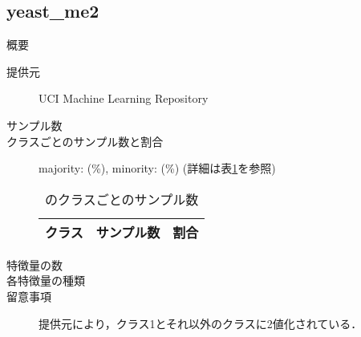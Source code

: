 \subsection{yeast\_me2}
\begin{description}
    \item[概要] \cite{}
    \item[提供元] UCI Machine Learning Repository
    \item[サンプル数] 
    \item[クラスごとのサンプル数と割合] majority:  (\%), minority:  (\%) (詳細は表\ref{tab:}を参照)

        \begin{table}[htbp]
            \centering
            \caption{のクラスごとのサンプル数}
            \label{tab:}
            \begin{tabular}{lrc} \hline
                \multicolumn{1}{c}{クラス}&
                \multicolumn{1}{c}{サンプル数}&
                \multicolumn{1}{c}{割合}\\
                \hline
                \hline

                \hline
            \end{tabular}
        \end{table}

    \item[特徴量の数] 
    \item[各特徴量の種類] \mbox{}
        
    \item[留意事項] 提供元により，クラス1とそれ以外のクラスに2値化されている．
\end{description}


